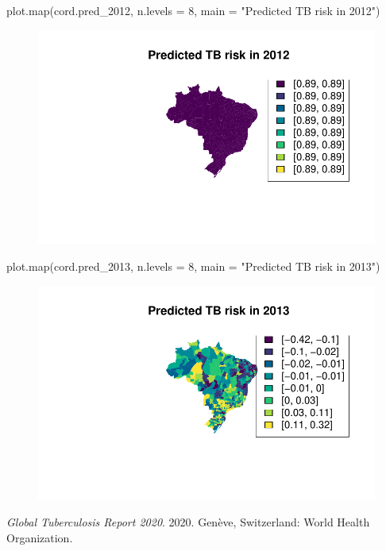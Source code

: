 \documentclass[
  letterpaper,
  DIV=11,
  numbers=noendperiod]{scrartcl}
\newenvironment{Shaded}{\begin{snugshade}}{\end{snugshade}}
\newcommand{\AttributeTok}[1]{\textcolor[rgb]{0.40,0.45,0.13}{#1}}
\newcommand{\DecValTok}[1]{\textcolor[rgb]{0.68,0.00,0.00}{#1}}
\newcommand{\FunctionTok}[1]{\textcolor[rgb]{0.28,0.35,0.67}{#1}}
\newcommand{\NormalTok}[1]{\textcolor[rgb]{0.00,0.23,0.31}{#1}}
\newcommand{\StringTok}[1]{\textcolor[rgb]{0.13,0.47,0.30}{#1}}
\newlength{\cslhangindent}
\newlength{\cslentryspacingunit} %
\newenvironment{CSLReferences}[2] %
 {%
  \setlength{\parindent}{0pt}
  \ifodd #1
  \let\oldpar\par
  \def\par{\hangindent=\cslhangindent\oldpar}
  \fi
  \setlength{\parskip}{#2\cslentryspacingunit}
 }%
 {}
\begin{document}
\begin{Shaded}
\begin{Highlighting}[]
\FunctionTok{plot.map}\NormalTok{(cord.pred\_2012, }\AttributeTok{n.levels =} \DecValTok{8}\NormalTok{, }\AttributeTok{main =} \StringTok{"Predicted TB risk in 2012"}\NormalTok{)}
\end{Highlighting}
\end{Shaded}

\begin{figure}[H]

{\centering \includegraphics{Group34Coursework_files/figure-pdf/unnamed-chunk-21-1.pdf}

}

\end{figure}

\begin{Shaded}
\begin{Highlighting}[]
\FunctionTok{plot.map}\NormalTok{(cord.pred\_2013, }\AttributeTok{n.levels =} \DecValTok{8}\NormalTok{, }\AttributeTok{main =} \StringTok{"Predicted TB risk in 2013"}\NormalTok{)}
\end{Highlighting}
\end{Shaded}

\begin{figure}[H]

{\centering \includegraphics{Group34Coursework_files/figure-pdf/unnamed-chunk-22-1.pdf}

}

\end{figure}

\hypertarget{refs}{}
\begin{CSLReferences}{1}{0}
\leavevmode{}%
\emph{Global Tuberculosis Report 2020}. 2020. Gen{è}ve, Switzerland:
World Health Organization.

\end{CSLReferences}
\end{document}
